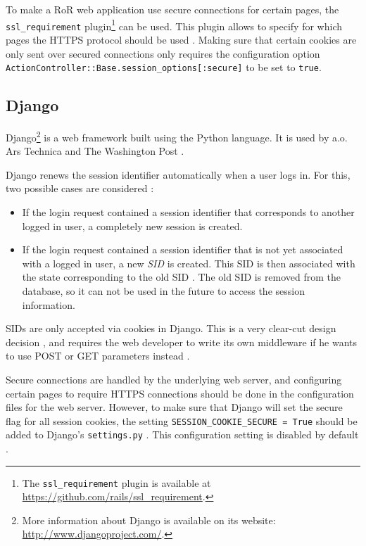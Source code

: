 To make a RoR web application use secure connections for certain pages, the \texttt{ssl\_requirement} plugin\footnote{The \texttt{ssl\_requirement} plugin is available at \url{https://github.com/rails/ssl_requirement}.} can be used. This plugin allows to specify for which pages the HTTPS protocol should be used \cite{Slater2008}. Making sure that certain cookies are only sent over secured connections only requires the configuration option \texttt{ActionController::Base.session\_options[:secure]} to be set to \texttt{true}.

\subsection{Django}

Django\footnote{More information about Django is available on its website: \url{http://www.djangoproject.com/}.} is a web framework built using the Python language. It is used by a.o. Ars Technica and The Washington Post \cite{DjangoPoweredBy}.

Django renews the session identifier automatically when a user logs in. For this, two possible cases are considered \cite{DjangoLoginCode}:
\begin{itemize}
	\item If the login request contained a session identifier that corresponds to another logged in user, a completely new session is created.
	\item If the login request contained a session identifier that is not yet associated with a logged in user, a new \emph{SID} is created. This SID is then associated with the state corresponding to the old SID \cite{DjangoSessionsCode}. The old SID is removed from the database, so it can not be used in the future to access the session information.
\end{itemize}

SIDs are only accepted via cookies in Django. This is a very clear-cut design decision \cite{DjangoSessions}, and requires the web developer to write its own middleware if he wants to use POST or GET parameters instead \cite{Fairs2007}.

Secure connections are handled by the underlying web server, and configuring certain pages to require HTTPS connections should be done in the configuration files for the web server. However, to make sure that Django will set the secure flag for all session cookies, the setting \texttt{SESSION\_COOKIE\_SECURE = True} should be added to Django's \texttt{settings.py} \cite{Barnham2009}. This configuration setting is disabled by default \cite{Holovaty2008}.

